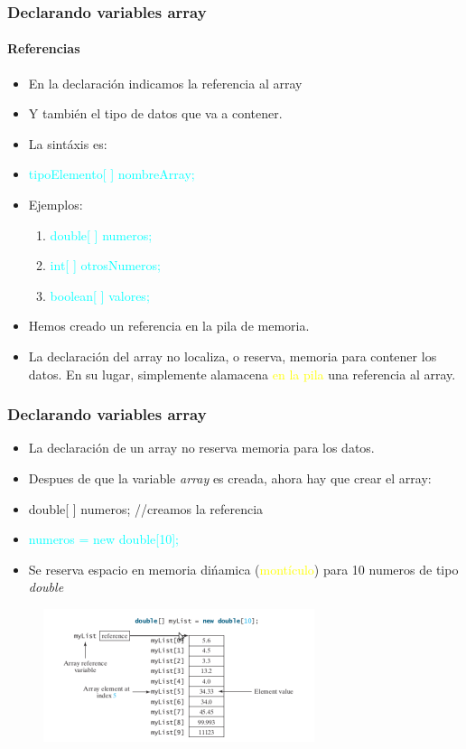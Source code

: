\documentclass{beamer}
\begin{document}
\begin{frame}
    \frametitle{Declarando variables array}
    \framesubtitle{Referencias}
      \begin{itemize}[<+->]
      \item En la declaración indicamos la referencia al array
      \item Y también el tipo de datos que va a contener.
      \item La sintáxis es:
      \item \textcolor{cyan}{tipoElemento[ ] nombreArray;}
      \item Ejemplos:
      \begin{enumerate}[<+->]
      	\item \textcolor{cyan}{double[ ] numeros;}
     	\item \textcolor{cyan}{int[ ] otrosNumeros;}
      	\item \textcolor{cyan}{boolean[ ] valores;}
      \end{enumerate}
      \item Hemos creado un referencia en la pila de memoria.
      \item La declaración del array no localiza, o reserva, memoria para contener los datos. En su lugar, simplemente alamacena \textcolor{yellow}{en la pila} una referencia al array.
            \end{itemize}
\end{frame}

\begin{frame}
    \frametitle{Declarando variables array}
      \begin{small}
\begin{itemize}[<+->]
      \item La declaración de un array no reserva memoria para los datos.
      \item Despues de que la variable \emph{array} es creada, ahora hay que crear el array:
      \item double[ ] numeros; //creamos la referencia
      \item \textcolor{cyan}{numeros =  new double[10];}
      \item Se reserva espacio en memoria dińamica (\textcolor{yellow}{montículo})  para 10 numeros de tipo \emph{double}
      \end{itemize}
\end{small}
      \pause
      \begin{figure}
      \includegraphics[scale=0.75]{imagenes/array1.png}
      \end{figure}
\end{frame}
\end{document}
